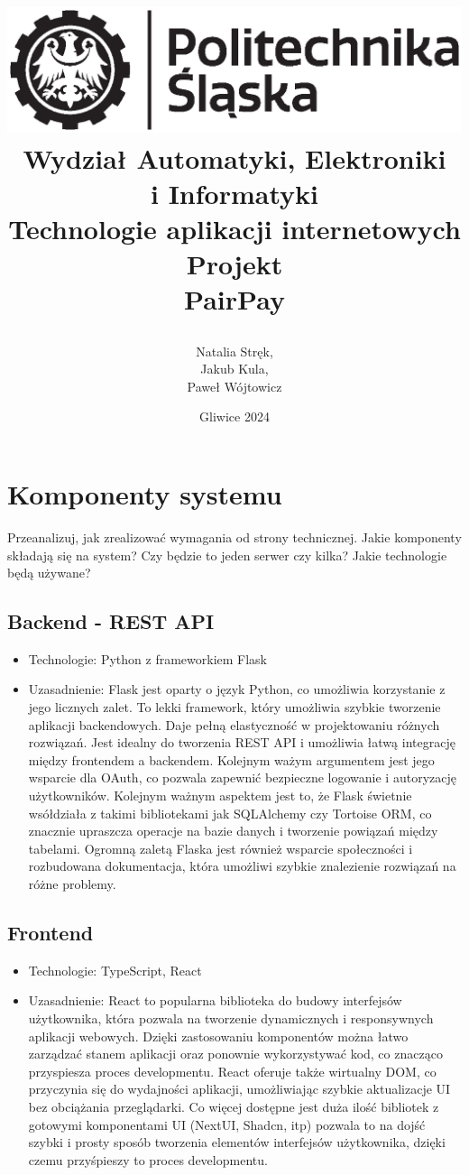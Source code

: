 \documentclass[12pt,titlepage]{article}
\title{
\includegraphics[scale=0.75]{img/politechnika_sl_logo_bw_poziom_pl.eps}\\
\textbf{Wydział Automatyki, Elektroniki\\
i Informatyki}\\
\vspace*{1cm}
Technologie aplikacji internetowych \\ Projekt \\ PairPay

\vspace*{5cm}
}
\author{
Natalia Stręk,\\
Jakub Kula,\\
Paweł Wójtowicz
}
\date{Gliwice 2024}
\begin{document}
\maketitle
\newpage
\section{Komponenty systemu}
Przeanalizuj, jak zrealizować wymagania od strony technicznej. Jakie komponenty składają się na system? Czy będzie to jeden serwer czy kilka? Jakie technologie będą używane?
\subsection{Backend - REST API}
\begin{itemize}
    \item Technologie: Python z frameworkiem Flask
    \item Uzasadnienie: Flask jest oparty o język Python, co umożliwia korzystanie z jego licznych zalet. To lekki framework, który umożliwia szybkie tworzenie aplikacji backendowych. Daje pełną elastyczność w projektowaniu różnych rozwiązań. Jest idealny do tworzenia REST API i umożliwia łatwą integrację między frontendem a backendem. Kolejnym ważym argumentem jest jego wsparcie dla OAuth, co pozwala zapewnić bezpieczne logowanie i autoryzację użytkowników. Kolejnym ważnym aspektem jest to, że Flask świetnie wsółdziała z takimi bibliotekami jak SQLAlchemy czy Tortoise ORM, co znacznie upraszcza operacje na bazie danych i tworzenie powiązań między tabelami. Ogromną zaletą Flaska jest również wsparcie społeczności i rozbudowana dokumentacja, która umożliwi szybkie znalezienie rozwiązań na różne problemy.
\end{itemize}

\subsection{Frontend}
\begin{itemize}
    \item Technologie: TypeScript, React
    \item Uzasadnienie: React to popularna biblioteka do budowy interfejsów użytkownika, która pozwala na tworzenie dynamicznych i responsywnych aplikacji webowych. Dzięki zastosowaniu komponentów można łatwo zarządzać stanem aplikacji oraz ponownie wykorzystywać kod, co znacząco przyspiesza proces developmentu. React oferuje także wirtualny DOM, co przyczynia się do wydajności aplikacji, umożliwiając szybkie aktualizacje UI bez obciążania przeglądarki. Co więcej dostępne jest duża ilość bibliotek z gotowymi komponentami UI (NextUI, Shadcn, itp) pozwala to na dojść szybki i prosty sposób tworzenia elementów interfejsów użytkownika, dzięki czemu przyśpieszy to proces developmentu.
\end{itemize}
\end{document}
